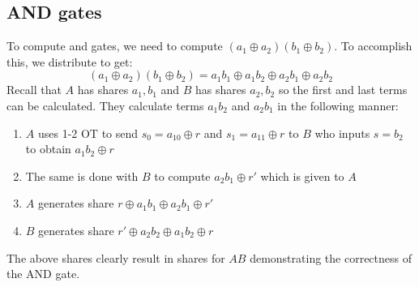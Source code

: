 \documentclass[11pt]{article}
\begin{document}
\subsection{AND gates}
To compute and gates, we need to compute $(a_1 \oplus a_2)(b_1 \oplus b_2)$. To accomplish this, we distribute to get:
$$(a_1 \oplus a_2)(b_1 \oplus b_2) = a_1b_1 \oplus a_1b_2 \oplus a_2b_1 \oplus a_2b_2$$
Recall that $A$ has shares $a_1,b_1$ and $B$ has shares $a_2,b_2$ so the first and last terms can be calculated. They calculate terms $a_1b_2$ and $a_2b_1$ in the following manner:
\begin{enumerate}
    \item $A$ uses 1-2 OT to send $s_0 = a_10 \oplus r$ and $s_1 = a_11 \oplus r$ to $B$ who inputs $s=b_2$ to obtain $a_1b_2 \oplus r$
    \item The same is done with $B$ to compute $a_2b_1 \oplus r'$ which is given to $A$
    \item $A$ generates share $r \oplus a_1b_1 \oplus a_2b_1 \oplus r'$
    \item $B$ generates share $r' \oplus a_2b_2 \oplus a_1b_2 \oplus r$
\end{enumerate}
The above shares clearly result in shares for $AB$ demonstrating the correctness of the AND gate.
\end{document}
